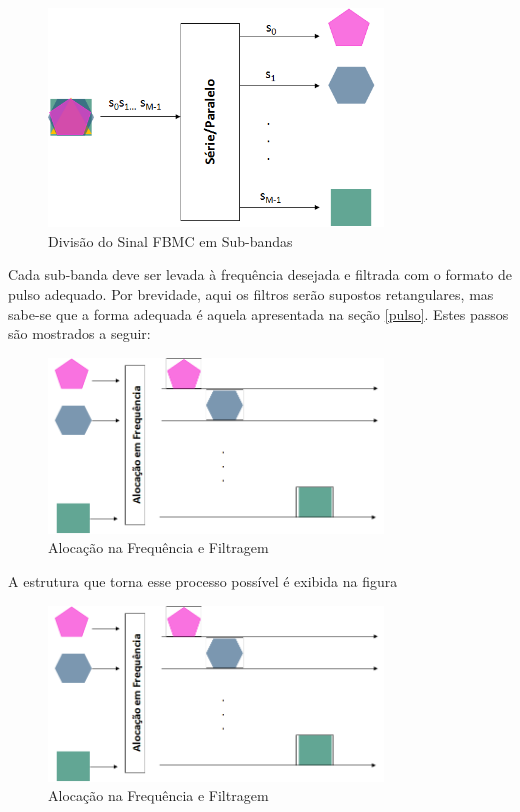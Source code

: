 \begin{figure}[h!]
\centering
\includegraphics[width=3.5in]{serie_paralelo.png}
\caption{Divisão do Sinal FBMC em Sub-bandas}
\label{espectro super FDM}
\end{figure}

\par Cada sub-banda deve ser levada à frequência desejada e filtrada com o formato de pulso adequado. Por brevidade, aqui os filtros serão supostos retangulares, mas sabe-se que a forma adequada é aquela apresentada na seção \ref{pulso}. Estes passos são mostrados a seguir:

\begin{figure}[h!]
\centering
\includegraphics[width=3.5in]{freq_aloc.png}
\caption{Alocação na Frequência e Filtragem}
\label{filtro_freq}
\end{figure}

\par A estrutura que torna esse processo possível é exibida na figura

\begin{figure}[h!]
\centering
\includegraphics[width=3.5in]{freq_aloc.png}
\caption{Alocação na Frequência e Filtragem}
\label{filtro_freq}
\end{figure}


